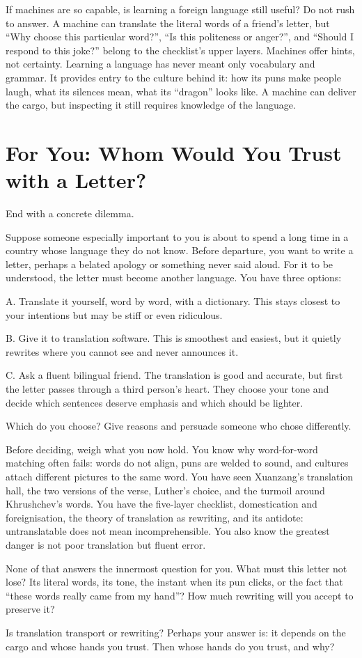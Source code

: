 If machines are so capable, is learning a foreign language still useful? Do not rush to answer. A machine can translate the literal words of a friend's letter, but ``Why choose this particular word?'', ``Is this politeness or anger?'', and ``Should I respond to this joke?'' belong to the checklist's upper layers. Machines offer hints, not certainty. Learning a language has never meant only vocabulary and grammar. It provides entry to the culture behind it: how its puns make people laugh, what its silences mean, what its ``dragon'' looks like. A machine can deliver the cargo, but inspecting it still requires knowledge of the language.

\section[Whom Would You Trust with a Letter?]{For You: Whom Would You Trust with a Letter?}
End with a concrete dilemma.

Suppose someone especially important to you is about to spend a long time in a country whose language they do not know. Before departure, you want to write a letter, perhaps a belated apology or something never said aloud. For it to be understood, the letter must become another language. You have three options:

A. Translate it yourself, word by word, with a dictionary. This stays closest to your intentions but may be stiff or even ridiculous.

B. Give it to translation software. This is smoothest and easiest, but it quietly rewrites where you cannot see and never announces it.

C. Ask a fluent bilingual friend. The translation is good and accurate, but first the letter passes through a third person's heart. They choose your tone and decide which sentences deserve emphasis and which should be lighter.

Which do you choose? Give reasons and persuade someone who chose differently.

Before deciding, weigh what you now hold. You know why word-for-word matching often fails: words do not align, puns are welded to sound, and cultures attach different pictures to the same word. You have seen Xuanzang's translation hall, the two versions of the verse, Luther's choice, and the turmoil around Khrushchev's words. You have the five-layer checklist, domestication and foreignisation, the theory of translation as rewriting, and its antidote: untranslatable does not mean incomprehensible. You also know the greatest danger is not poor translation but fluent error.

None of that answers the innermost question for you. What must this letter not lose? Its literal words, its tone, the instant when its pun clicks, or the fact that ``these words really came from my hand''? How much rewriting will you accept to preserve it?

Is translation transport or rewriting? Perhaps your answer is: it depends on the cargo and whose hands you trust. Then whose hands do you trust, and why?
